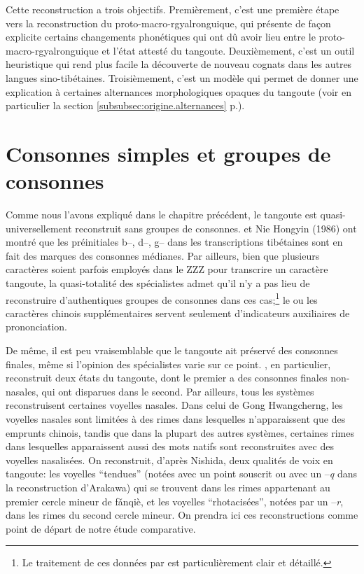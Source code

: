\documentclass[oldfontcommands,twoside,a4paper,11pt,draft]{memoir}
\newcommand{\ipa}[1]{{\phon #1}} %
\begin{document}
Cette reconstruction a trois objectifs. Premièrement, c'est une première étape vers la reconstruction du proto-macro-rgyalronguique, qui présente de façon explicite certains changements phonétiques qui ont dû avoir lieu entre le proto-macro-rgyalronguique et l'état attesté du tangoute. Deuxièmement, c'est un outil heuristique qui rend plus facile la  découverte de nouveau cognats dans les autres langues sino-tibétaines. Troisièmement, c'est un modèle qui permet de donner une explication à certaines alternances morphologiques opaques du tangoute (voir en particulier la section \ref{subsubsec:origine.alternances} p.\pageref{subsubsec:origine.alternances}).

\section{Consonnes simples et groupes de consonnes} \label{sec:initiales}
Comme nous l'avons expliqué dans le chapitre précédent, le tangoute est quasi-universellement reconstruit sans groupes de consonnes. \citet[112]{sofronov68a} et Nie Hongyin (1986) ont montré que les préinitiales b--, d--, g-- dans les transcriptions tibétaines sont en fait des marques des consonnes médianes. Par ailleurs, bien que plusieurs caractères soient parfois employés dans le ZZZ pour transcrire un caractère tangoute, la quasi-totalité des spécialistes admet qu'il n'y a pas lieu de reconstruire d'authentiques groupes de consonnes dans ces cas;\footnote{Le traitement de ces données par \citet[85-114]{lifw94zzz} est particulièrement clair et détaillé.} le ou les caractères chinois supplémentaires servent seulement d'indicateurs auxiliaires de prononciation.

De même, il est peu vraisemblable que le tangoute ait préservé des consonnes finales, même si l'opinion des spécialistes varie sur ce point. \citet{sofronov68a}, en particulier, reconstruit deux états du tangoute, dont le premier a des consonnes finales non-nasales, qui ont disparues dans le second. Par ailleurs, tous les systèmes reconstruisent certaines voyelles nasales. Dans celui de Gong Hwangcherng, les voyelles nasales sont limitées à des rimes dans lesquelles n'apparaissent  que des emprunts chinois, tandis que dans la plupart des autres systèmes, certaines rimes dans lesquelles apparaissent aussi des mots natifs sont reconstruites avec des voyelles nasalisées. On reconstruit, d'après Nishida, deux qualités de voix en tangoute: les voyelles ``tendues'' (notées avec un point souscrit ou avec un --\textit{q} dans la reconstruction d'Arakawa) qui se trouvent dans les rimes appartenant au premier cercle mineur de \ipa{fǎnqiè}, et les voyelles ``rhotacisées'', notées par un --\textit{r}, dans les rimes du second cercle mineur.	On prendra ici ces reconstructions comme point de départ de notre étude comparative.
\end{document}
